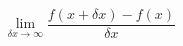 \documentclass[preview]{standalone}
\begin{document}
\begin{center}
$$\lim_{\delta x \to \infty}\frac{f(x + \delta x) - f(x)}{\delta x}$$
\end{center}
\end{document}
